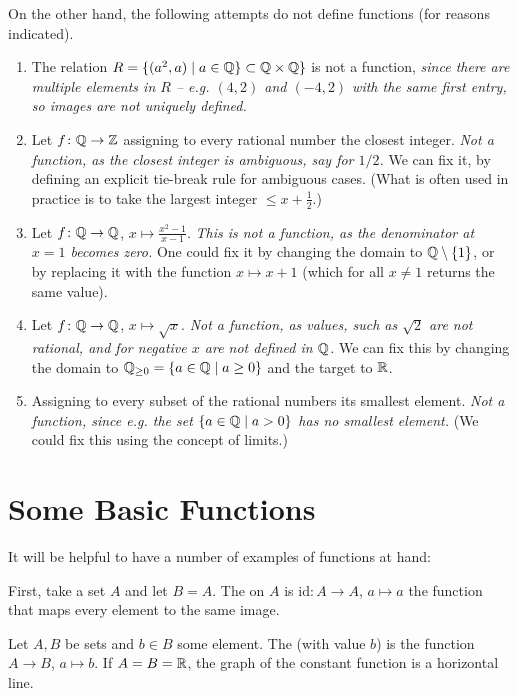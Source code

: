 On the other hand, the following attempts do not define functions (for
reasons indicated).
\begin{enumerate}
\item The relation $R=\{(a^2,a)\mid a\in{\mathbb Q}\}\subset{\mathbb Q}\times{\mathbb Q}\}$ is not a
function, {\em since there are multiple elements in $R$ -- e.g. $(4,2)$ and
$(-4,2)$ with the same first entry, so images are not uniquely defined.}
\item
Let $f\colon{\mathbb Q}\to{\mathbb Z}$ assigning to every rational number the
closest integer. {\em Not a function, as the closest integer is ambiguous,
say for $1/2$.} We can fix it, by defining an explicit tie-break rule for
ambiguous cases. (What is often used in practice is to take the largest integer $\le
x+\frac{1}{2}$.)
\item
Let $f\colon{\mathbb Q}\to{\mathbb Q}$, $x\mapsto\frac{x^2-1}{x-1}$. {\em This is not a function,
as the denominator at $x=1$ becomes zero.} One could fix it by changing the
domain to ${\mathbb Q}\setminus\{1\}$, or by replacing it with the function $x\mapsto
x+1$ (which for all $x\not=1$ returns the same value).
\item
Let $f\colon{\mathbb Q}\to{\mathbb Q}$, $x\mapsto\sqrt{x}$. {\em Not a function, as values,
such as $\sqrt{2}$ are not rational, and for negative $x$ are not defined in ${\mathbb Q}$.}
We can fix this by changing the domain to ${\mathbb Q}_{\ge 0}=\{a\in{\mathbb Q}\mid
a\ge 0\}$ and the target to ${\mathbb R}$.
\item Assigning to every subset of the rational numbers its smallest
element. {\em Not a function, since e.g. the set $\{a\in{\mathbb Q}\mid a>0\}$ has no
smallest element.} (We could fix this using the concept of
limits.)
\end{enumerate}

\section{Some Basic Functions}

It will be helpful to have a number of examples of functions at hand:
\medskip

First, take a set $A$ and let $B=A$. The  on $A$ is
$\mbox{id}\colon A\to A$, $a\mapsto a$ the function that maps every element to the same
image.

\medskip
Let $A,B$ be sets and $b\in B$ some element. The  (with value
$b$) is the function $A\to B$, $a\mapsto b$. If $A=B={\mathbb R}$, the graph of the constant
function is a horizontal line.

\medskip

